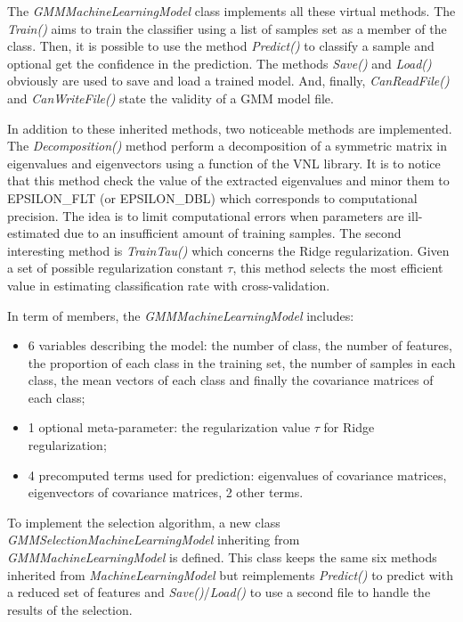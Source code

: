 \documentclass[a4paper,11pt,DIV=16]{scrartcl}
\begin{document}
        The \emph{GMMMachineLearningModel} class implements all these virtual methods. The \emph{Train()} aims to train the classifier using a list of samples set as a member of the class. Then, it is possible to use the method \emph{Predict()} to classify a sample and optional get the confidence in the prediction. The methods \emph{Save()} and \emph{Load()} obviously are used to save and load a trained model. And, finally, \emph{CanReadFile()} and \emph{CanWriteFile()} state the validity of a GMM model file.

        In addition to these inherited methods, two noticeable methods are implemented. The \emph{Decomposition()} method perform a decomposition of a symmetric matrix in eigenvalues and eigenvectors using a function of the VNL library. It is to notice that this method check the value of the extracted eigenvalues and minor them to EPSILON\_FLT (or EPSILON\_DBL) which corresponds to computational precision.  The idea is to limit computational errors when parameters are ill-estimated due to an insufficient amount of training samples. The second interesting method is \emph{TrainTau()} which concerns the Ridge regularization. Given a set of possible regularization constant $\tau$, this method selects the most efficient value in estimating classification rate with cross-validation.

        In term of members, the \emph{GMMMachineLearningModel} includes:
        \begin{itemize}
            \item 6 variables describing the model: the number of class, the number of features, the proportion of each class in the training set, the number of samples in each class, the mean vectors of each class and finally the covariance matrices of each class;
            \item 1 optional meta-parameter: the regularization value $\tau$ for Ridge regularization;
            \item 4 precomputed terms used for prediction: eigenvalues of covariance matrices, eigenvectors of covariance matrices, 2 other terms.
        \end{itemize}

        To implement the selection algorithm, a new class \emph{GMMSelectionMachineLearningModel} inheriting from \emph{GMMMachineLearningModel} is defined. This class keeps the same six methods inherited from \emph{MachineLearningModel} but reimplements \emph{Predict()} to predict with a reduced set of features and  \emph{Save()}/\emph{Load()} to use a second file to handle the results of the selection.
\end{document}
